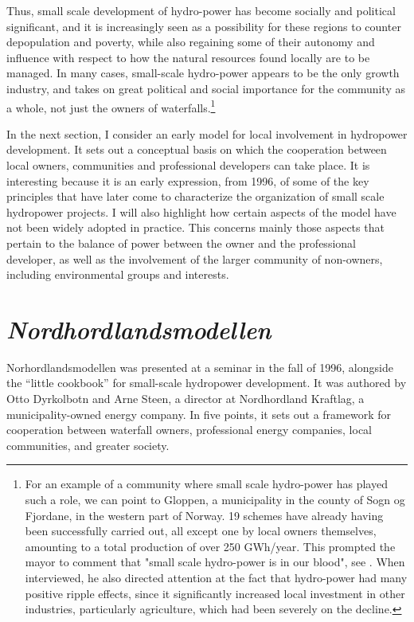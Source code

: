Thus, small scale development of hydro-power has become socially and political significant, and it is increasingly seen as a possibility for these regions to counter depopulation and poverty, while also regaining some of their autonomy and influence with respect to how the natural resources found locally are to be managed. In many cases, small-scale hydro-power appears to be the only growth industry, and takes on great political and social importance for the community as a whole, not just the owners of waterfalls.\footnote{For an example of a community where small scale hydro-power has played such a role, we can point to Gloppen, a municipality in the county of Sogn og Fjordane, in the western part of Norway. 19 schemes have already having been successfully carried out, all except one by local owners themselves, amounting to a total production of over 250 GWh/year. This prompted the mayor to comment that "small scale hydro-power is in our blood", see \cite{Gloppen}. When interviewed, he also directed attention at the fact that hydro-power had many positive ripple effects, since it significantly increased local investment in other industries, particularly agriculture, which had been severely on the decline.}

In the next section, I consider an early model for local involvement in hydropower development. It sets out a conceptual basis on which the cooperation between local owners, communities and professional developers can take place. It is interesting because it is an early expression, from 1996, of some of the key principles that have later come to characterize the organization of small scale hydropower projects. I will also highlight how certain aspects of the model have not been widely adopted in practice. This concerns mainly those aspects that pertain to the balance of power between the owner and the professional developer, as well as the involvement of the larger community of non-owners, including environmental groups and interests. 

\section{{\it Nordhordlandsmodellen}}

Norhordlandsmodellen was presented at a seminar in the fall of 1996, alongside the ``little cookbook'' for small-scale hydropower development.  It was authored by Otto Dyrkolbotn and  Arne Steen, a director at Nordhordland Kraftlag, a municipality-owned energy company. In five points, it sets out a framework for cooperation between waterfall owners, professional energy companies, local communities, and greater society.

